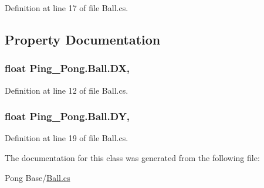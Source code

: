 Definition at line 17 of file Ball.\-cs.



\subsection{Property Documentation}
\hypertarget{class_ping___pong_1_1_ball_af3e8f435dbdb315523fd1bebb2032374}{
\subsubsection[{D\-X}]{\setlength{\rightskip}{0pt plus 5cm}float Ping\-\_\-\-Pong.\-Ball.\-D\-X\hspace{0.3cm}{\ttfamily [get]}, {\ttfamily [set]}}}\label{class_ping___pong_1_1_ball_af3e8f435dbdb315523fd1bebb2032374}


Definition at line 12 of file Ball.\-cs.

\hypertarget{class_ping___pong_1_1_ball_a733b32b50c29c5c39e8a94654f9e3309}{
\subsubsection[{D\-Y}]{\setlength{\rightskip}{0pt plus 5cm}float Ping\-\_\-\-Pong.\-Ball.\-D\-Y\hspace{0.3cm}{\ttfamily [get]}, {\ttfamily [set]}}}\label{class_ping___pong_1_1_ball_a733b32b50c29c5c39e8a94654f9e3309}


Definition at line 19 of file Ball.\-cs.



The documentation for this class was generated from the following file\-:\begin{DoxyCompactItemize}
\item 
Pong Base/\hyperlink{_ball_8cs}{Ball.\-cs}\end{DoxyCompactItemize}
